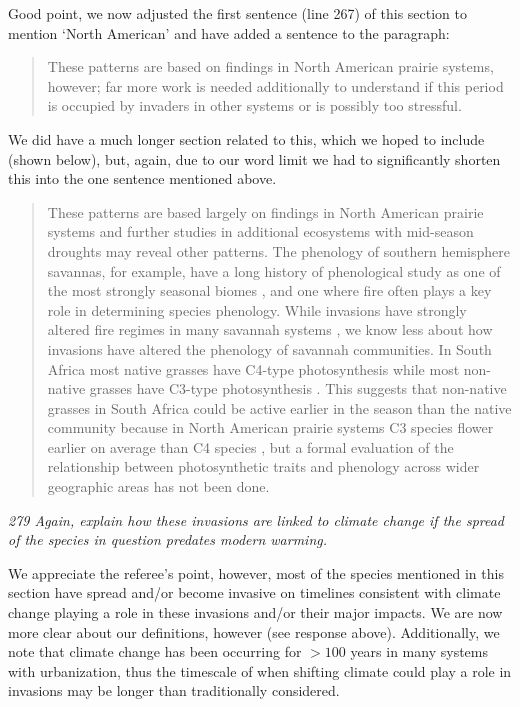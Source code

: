 \documentclass[11pt,a4paper]{letter}
\begin{document}
\begin{letter}{}
Good point, we now adjusted the first sentence (line 267) of this section to mention `North American' and have added a sentence to the paragraph:
\begin{quote}
These patterns are based on findings in North American prairie systems, however; far more work is needed additionally to understand if this period is occupied by invaders in other systems or is possibly too stressful. 
\end{quote}
We did have a much longer section related to this, which we hoped to include (shown below), but, again, due to our word limit we had to significantly shorten this into the one sentence mentioned above.
\begin{quote}
These patterns are based largely on findings in North American prairie systems and further studies in additional ecosystems with mid-season droughts may reveal other patterns. The phenology of southern hemisphere savannas, for example, have a long history of phenological study as one of the most strongly seasonal biomes \citep[reviewed in][]{Sarmiento1983}, and one where fire often plays a key role in determining species phenology. While invasions have strongly altered fire regimes in many savannah systems \citep{DAntonio:1992pj}, we know less about how invasions have altered the phenology of savannah communities.  In South Africa most native grasses have C4-type photosynthesis while most non-native grasses have C3-type photosynthesis \citep{milton2004}.  This suggests that non-native grasses in South Africa could be active earlier in the season than the native community because in North American prairie systems C3 species flower earlier on average than C4 species \citep{Craine:2012kl}, but a formal evaluation of the relationship between photosynthetic traits and phenology across wider geographic areas has not been done.
\end{quote}

\emph{279 Again, explain how these invasions are linked to climate change if the spread of the species in question predates modern warming.}

We appreciate the referee's point, however, most of the species mentioned in this section have spread and/or become invasive on timelines consistent with climate change playing a role in these invasions and/or their major impacts. We are now more clear about our definitions, however (see response above). Additionally, we note that climate change has been occurring for $>100$ years in many systems with urbanization, thus the timescale of when shifting climate could play a role in invasions may be longer than traditionally considered. \\


\end{letter}
\end{document}
